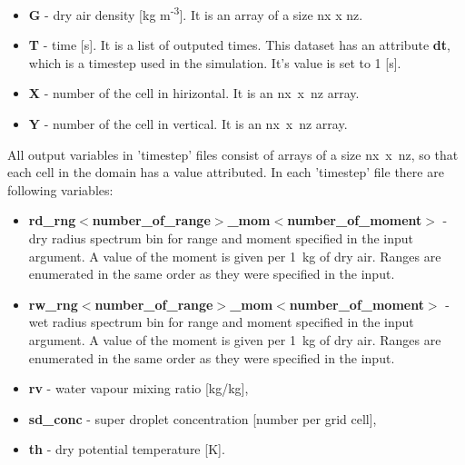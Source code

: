 \documentclass[11pt]{article}
\begin{document}
\begin{itemize}
\item \textbf{G} - dry air density [kg m\textsuperscript{-3}]. It is an array of a size nx x nz.
\item \textbf{T} - time [s]. It is a list of outputed times. This dataset has an attribute \textbf{dt}, which is a timestep used in the simulation. It's value is set to 1 [s]. 
\item \textbf{X} - number of the cell in hirizontal. It is an nx~x~nz array.
\item \textbf{Y} - number of the cell in vertical. It is an nx~x~nz array.
\end{itemize}

All output variables in 'timestep' files consist of arrays of a size nx~x~nz, so that each cell in the domain has a value attributed. In each 'timestep' file there are following variables:

\begin{itemize}
\item \textbf{rd\_rng$<$number\_of\_range$>$\_mom$<$number\_of\_moment$>$} - dry radius spectrum bin for range and moment specified in the input argument. A value of the moment is given per 1~kg of dry air. Ranges are enumerated in the same order as they were specified in the input. 

\item \textbf{rw\_rng$<$number\_of\_range$>$\_mom$<$number\_of\_moment$>$} - wet radius spectrum bin for range and moment specified in the input argument. A value of the moment is given per 1~kg of dry air. Ranges are enumerated in the same order as they were specified in the input.  

\item \textbf{rv} - water vapour mixing ratio [kg/kg],

\item \textbf{sd\_conc} - super droplet concentration [number per grid cell],

\item \textbf{th} - dry potential temperature [K].

\end{itemize}
\end{document}
